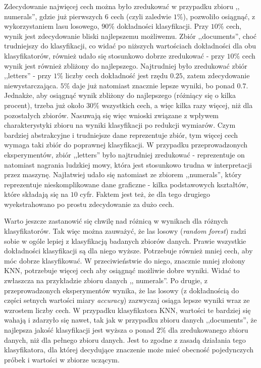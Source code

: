 \documentclass{classrep}
\begin{document}
{{            Zdecydowanie najwięcej cech można było zredukować w przypadku zbioru ,,
            numerals'', gdzie już pierwszych $6$ cech (czyli zaledwie $1\%$), pozwoliło
            osiągnąć, z wykorzystaniem lasu losowego, $90\%$ dokładności klasyfikacji.
            Przy $10\%$ cech, wynik jest zdecydowanie bliski najlepszemu możliwemu.
            Zbiór ,,documents'', choć trudniejszy do klasyfikacji, co widać po niższych
            wartościach dokładności dla obu klasyfikatorów, również udało się
            stosunkowo dobrze zredukować - przy $10\%$ cech wynik jest również zbliżony
            do najlepszego. Najtrudniej było zredukować zbiór ,,letters'' - przy $1\%$
            liczby cech dokładność jest rzędu $0.25$, zatem zdecydowanie
            niewystarczająca. $5\%$ daje już natomiast znacznie lepsze wyniki, bo ponad
            $0.7$. Jednakże, aby osiągnąć wynik zbliżony do najlepszego (różniący się o
            kilka procent), trzeba już około $30\%$ wszystkich cech, a więc kilka razy
            więcej, niż dla pozostałych zbiorów. Nasuwają się więc wnioski związane z
            wpływem charakterystyki zbioru na wyniki klasyfikacji po redukcji wymiarów.
            Czym bardziej abstrakcyjne i trudniejsze dane reprezentuje zbiór, tym
            więcej cech wymaga taki zbiór do poprawnej klasyfikacji. W przypadku
            przeprowadzonych eksperymentów, zbiór ,,letters'' było najtrudniej
            zredukować - reprezentuje on natomiast nagrania ludzkiej mowy, która jest
            stosunkowo trudna w interpretacji przez maszynę. Najłatwiej udało się
            natomiast ze zbiorem ,,numerals'', który reprezentuje nieskomplikowane dane
            graficzne - kilka podstawowych kształtów, które składają się na $10$ cyfr.
            Faktem jest też, że dla tego drugiego wyekstrahowano po prostu zdecydowanie
            za dużo cech.

            Warto jeszcze zastanowić się chwilę nad różnicą w wynikach dla różnych
            klasyfikatorów. Tak więc można zauważyć, że las losowy (\emph{random
            forest}) radzi sobie w ogóle lepiej z klasyfikacją badanych zbiorów danych.
            Prawie wszystkie dokładności klasyfikacji są dla niego wyższe. Potrzebuje
            również mniej cech, aby móc dobrze klasyfikować. W przeciwieństwie do
            niego, znacznie mniej złożony KNN, potrzebuje więcej cech aby osiągnąć
            możliwie dobre wyniki. Widać to zwłaszcza na przykładzie zbioru danych ,,
            numerals''. Po drugie, z przeprowadzonych eksperymentów wynika, że las
            losowy (z dokładnością do części setnych wartości miary \emph{accuracy})
            zazwyczaj osiąga lepsze wyniki wraz ze wzrostem liczby cech. W przypadku
            klasyfikatora KNN, wartości te bardziej się wahają i zdarzyło się nawet,
            tak jak w przypadku zbioru danych ,,documents'', że najlepsza jakość
            klasyfikacji jest wyższa o ponad $2\%$ dla zredukowanego zbioru danych, niż
            dla pełnego zbioru danych. Jest to zgodne z zasadą działania tego
            klasyfikatora, dla której decydujące znaczenie może mieć obecność
            pojedynczych próbek i wartości w zbiorze uczącym.
        }

}
\end{document}
